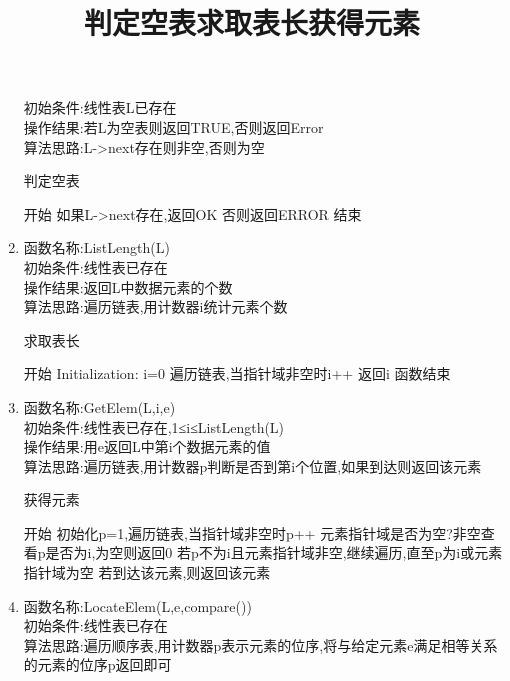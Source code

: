 \documentclass[supercite]{HustGraduPaper}
\theoremstyle{definition}
\begin{document}
\begin{enumerate}
	      初始条件:线性表L已存在\\
	      操作结果:若L为空表则返回TRUE,否则返回Error
	      \\
	      算法思路:L->next存在则非空,否则为空
	      \begin{algorithm}[htb]
		      \title{判定空表}
		      \caption{判定空表}
		      \begin{algorithmic}[1]
			      \State 开始
			      \State 如果L->next存在,返回OK
			      \State 否则返回ERROR
			      \State 结束
		      \end{algorithmic}\label{L4}
	      \end{algorithm}
	\item 函数名称:ListLength(L)\\
	      初始条件:线性表已存在\\
	      操作结果:返回L中数据元素的个数\\
	      算法思路:遍历链表,用计数器i统计元素个数
	      \begin{algorithm}[htb]
		      \title{求取表长}
		      \caption{求取表长}
		      \begin{algorithmic}[1]
			      \State 开始
			      \State Initialization: i=0
			      \State 遍历链表,当指针域非空时i++
			      \State 返回i
			      \State 函数结束
		      \end{algorithmic}\label{L5}
	      \end{algorithm}
	\item 函数名称:GetElem(L,i,e)\\
	      初始条件:线性表已存在,1≤i≤ListLength(L)\\
	      操作结果:用e返回L中第i个数据元素的值\\
	      算法思路:遍历链表,用计数器p判断是否到第i个位置,如果到达则返回该元素
	      \begin{algorithm}[htb]
		      \title{获得元素}
		      \caption{获得元素}
		      \begin{algorithmic}[1]
			      \State 开始
			      \State 初始化p=1,遍历链表,当指针域非空时p++
			      \State 元素指针域是否为空?非空查看p是否为i,为空则返回0
			      \State 若p不为i且元素指针域非空,继续遍历,直至p为i或元素指针域为空
			      \State 若到达该元素,则返回该元素
		      \end{algorithmic}\label{L6}
	      \end{algorithm}
	\item 函数名称:LocateElem(L,e,compare())\\
	      初始条件:线性表已存在\\
	      算法思路:遍历顺序表,用计数器p表示元素的位序,将与给定元素e满足相等关系的元素的位序p返回即可

\end{enumerate}
\end{document}
